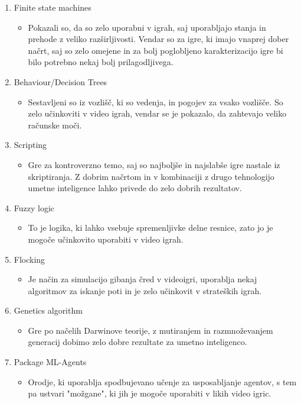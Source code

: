 \documentclass[a4paper, 12pt]{book}
\begin{document}
\begin{enumerate}
    \item Finite state machines
        \begin{itemize}
            \item Pokazali so, da so zelo uporabni v igrah, saj uporabljajo stanja in prehode z veliko razširljivosti. Vendar so za igre, ki imajo vnaprej dober načrt, saj so zelo omejene in za bolj poglobljeno karakterizacijo igre bi bilo potrebno nekaj bolj prilagodljivega.
        \end{itemize}
    \item Behaviour/Decision Trees
        \begin{itemize}
            \item Sestavljeni so iz vozlišč, ki so vedenja, in pogojev za vsako vozlišče. So zelo učinkoviti v video igrah, vendar se je pokazalo, da zahtevajo veliko računske moči.
        \end{itemize}
    \item Scripting
        \begin{itemize}
            \item Gre za kontroverzno temo, saj so najboljše in najslabše igre nastale iz skriptiranja. Z dobrim načrtom in v kombinaciji z drugo tehnologijo umetne inteligence lahko privede do zelo dobrih rezultatov.
        \end{itemize}
    \item Fuzzy logic
        \begin{itemize}
            \item To je logika, ki lahko vsebuje spremenljivke delne resnice, zato jo je mogoče učinkovito uporabiti v video igrah.
        \end{itemize}
    \item Flocking
        \begin{itemize}
            \item Je način za simulacijo gibanja čred v videoigri, uporablja nekaj algoritmov za iskanje poti in je zelo učinkovit v strateških igrah.
        \end{itemize}
    \item Genetics algorithm
        \begin{itemize}
            \item Gre po načelih Darwinove teorije, z mutiranjem in razmnoževanjem generacij dobimo zelo dobre rezultate za umetno inteligenco.
        \end{itemize}
        \clearpage
    \item Package ML-Agents
        \begin{itemize}
            \item Orodje, ki uporablja spodbujevano učenje za usposabljanje agentov, s tem pa ustvari "možgane", ki jih je mogoče uporabiti v likih video igric.
        \end{itemize}
\end{enumerate}
\end{document}
